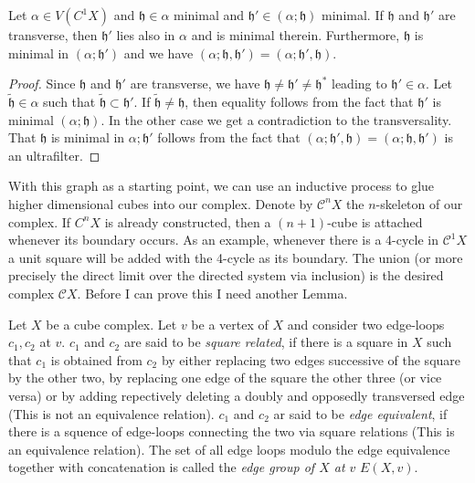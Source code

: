 \begin{lemma}
  Let \(\alpha \in V(C^1X)\) and \(\mathfrak{h} \in \alpha\) minimal and \(\mathfrak{h'} \in (\alpha; \mathfrak{h})\) minimal. If \(\mathfrak{h}\) and \(\mathfrak{h'}\) are transverse, then \(\mathfrak{h'}\) lies also in \(\alpha\) and is minimal therein. Furthermore, \(\mathfrak{h}\) is minimal in \((\alpha; \mathfrak{h'})\) and we have \((\alpha; \mathfrak{h}, \mathfrak{h'}) = (\alpha; \mathfrak{h'}, \mathfrak{h})\).
\end{lemma}

\begin{proof}
  Since \(\mathfrak{h}\) and \(\mathfrak{h'}\) are transverse, we have \(\mathfrak{h} \neq \mathfrak{h'} \neq \mathfrak{h}^\ast \) leading to \(\mathfrak{h'} \in \alpha\). Let \(\mathfrak{\tilde h} \in \alpha\) such that \(\mathfrak{\tilde h} \subset \mathfrak{h'}\). If \(\mathfrak{\tilde h} \neq \mathfrak{h}\), then equality follows from the fact that \(\mathfrak{h'}\) is minimal \((\alpha; \mathfrak{h})\). In the other case we get a contradiction to the transversality. That \(\mathfrak{h}\) is minimal in \(\alpha; \mathfrak{h'}\) follows from the fact that \((\alpha; \mathfrak{h'}, \mathfrak{h}) = (\alpha; \mathfrak{h}, \mathfrak{h'})\) is an ultrafilter.
\end{proof}

With this graph as a starting point, we can use an inductive process to glue higher dimensional cubes into our complex. Denote by \(\mathcal{C}^nX\) the \(n\)-skeleton of our complex. If \(C^nX\) is already constructed, then a \((n+1)\)-cube is attached whenever its boundary occurs. As an example, whenever there is a 4-cycle in \(\mathcal{C}^1X\) a unit square will be added with the 4-cycle as its boundary. The union (or more precisely the direct limit over the directed system via inclusion) is the desired complex \(\mathcal{C}X\). Before I can prove this I need another Lemma.

\begin{defin}
  Let \(X\) be a cube complex. Let \(v\) be a vertex of \(X\) and consider two edge-loops \(c_1, c_2\) at \(v\). \(c_1\) and \(c_2\) are said to be \emph{square related}, if there is a square in \(X\) such that \(c_1\) is obtained from \(c_2\) by either replacing two edges successive of the square by the other two, by replacing one edge of the square the other three  (or vice versa) or by adding repectively deleting a doubly and opposedly transversed edge (This is not an equivalence relation). \(c_1\) and \(c_2\) ar said to be \emph{edge equivalent}, if there is a squence of edge-loops connecting the two via square relations (This is an equivalence relation). The set of all edge loops modulo the edge equivalence together with concatenation is called the \emph{edge group of \(X\) at \(v\)} \(E(X,v)\).
\end{defin}

